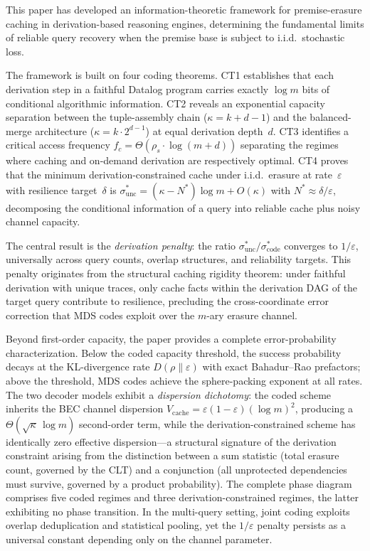 \documentclass[journal]{IEEEtran}
\numberwithin{equation}{section}
\begin{document}
This paper has developed an information-theoretic framework for
premise-erasure caching in derivation-based reasoning engines,
determining the fundamental limits of reliable query recovery when
the premise base is subject to i.i.d.\ stochastic loss.

The framework is built on four coding theorems.
CT1 establishes that each derivation step in a faithful Datalog
program carries exactly $\log m$ bits of conditional algorithmic
information.
CT2 reveals an exponential capacity separation between the
tuple-assembly chain ($\kappa=k{+}d{-}1$) and the balanced-merge
architecture ($\kappa=k\cdot 2^{d-1}$) at equal derivation
depth~$d$.
CT3 identifies a critical access frequency
$f_c=\Theta(\rho_s\cdot\log(m{+}d))$ separating the regimes
where caching and on-demand derivation are respectively optimal.
CT4 proves that the minimum derivation-constrained cache under
i.i.d.\ erasure at rate~$\varepsilon$ with resilience
target~$\delta$ is
$\sigma^*_{\mathrm{unc}}=(\kappa{-}N^*)\log m+O(\kappa)$ with
$N^*\approx\delta/\varepsilon$, decomposing the conditional
information of a query into reliable cache plus noisy channel
capacity.

The central result is the \emph{derivation penalty}: the ratio
$\sigma^*_{\mathrm{unc}}/\sigma^*_{\mathrm{code}}$ converges to
$1/\varepsilon$, universally across query counts, overlap
structures, and reliability targets.
This penalty originates from the structural caching rigidity
theorem: under faithful derivation with unique traces, only cache
facts within the derivation DAG of the target query contribute to
resilience, precluding the cross-coordinate error correction that
MDS codes exploit over the $m$-ary erasure channel.

Beyond first-order capacity, the paper provides a complete
error-probability characterization.
Below the coded capacity threshold, the success probability decays
at the KL-divergence rate $D(\rho\|\varepsilon)$ with exact
Bahadur--Rao prefactors; above the threshold, MDS codes achieve
the sphere-packing exponent at all rates.
The two decoder models exhibit a \emph{dispersion dichotomy}: the
coded scheme inherits the BEC channel dispersion
$V_{\mathrm{cache}}=\varepsilon(1{-}\varepsilon)(\log m)^2$,
producing a $\Theta(\sqrt\kappa\,\log m)$ second-order term,
while the derivation-constrained scheme has identically zero
effective dispersion---a structural signature of the derivation
constraint arising from the distinction between a sum statistic
(total erasure count, governed by the CLT) and a conjunction (all
unprotected dependencies must survive, governed by a product
probability).
The complete phase diagram comprises five coded regimes and three
derivation-constrained regimes, the latter exhibiting no phase
transition.
In the multi-query setting, joint coding exploits overlap
deduplication and statistical pooling, yet the $1/\varepsilon$
penalty persists as a universal constant depending only on the
channel parameter.
\end{document}

